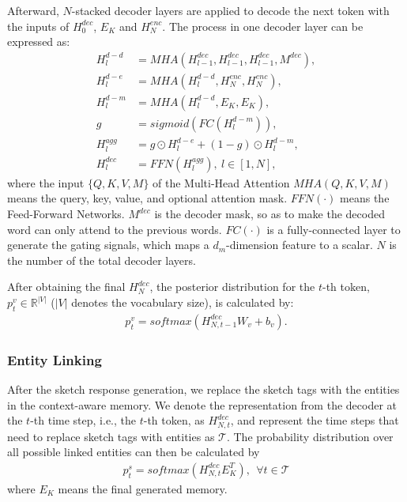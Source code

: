 \documentclass[11pt]{article}
\begin{document}
Afterward, $N$-stacked decoder layers are applied to decode the next token with the inputs of $H_0^{dec}$, $E_K$ and $H_N^{enc}$. The process in one decoder layer can be expressed as:
\begin{align}
    H_{l}^{d-d} &= MHA(H_{l-1}^{dec}, H_{l-1}^{dec}, H_{l-1}^{dec}, M^{dec}), \nonumber\\
    H_{l}^{d-e} &= MHA(H_{l}^{d-d}, H_N^{enc}, H_N^{enc}),  \nonumber\\
    H_{l}^{d-m} &= MHA(H_{l}^{d-d}, E_K, E_K),  \nonumber\\
    g &= sigmoid(FC(H_{l}^{d-m})),  \nonumber \\
    H_{l}^{agg} &= g \odot H_{l}^{d-e} + (1 - g) \odot H_{l}^{d-m},  \nonumber\\
    H_{l}^{dec} &= FFN(H_{l}^{agg}), \ l \in [1, N], \nonumber
\end{align}
where the input $\{Q,K,V,M\}$ of the Multi-Head Attention $MHA(Q, K, V, M)$ means the query, key, value, and optional attention mask. $FFN(\cdot)$ means the Feed-Forward Networks. $M^{dec}$ is the decoder mask, so as to make the decoded word can only attend to the previous words.
$FC(\cdot)$ is a fully-connected layer to generate the gating signals, which maps a $d_m$-dimension feature to a scalar. $N$ is the number of the total decoder layers.

After obtaining the final $H_{N}^{dec}$, the posterior distribution for the $t$-th token, $p_t^{v} \in \mathbb{R} ^{|V|}$ ($|V|$ denotes the vocabulary size), is calculated by:
\begin{gather}
    p_t^{v} = softmax(H_{N,t-1}^{dec}W_v + b_v). \nonumber
\end{gather}



\subsubsection{Entity Linking}
\label{ssec:linking}

After the sketch response generation, we replace the sketch tags with the entities in the context-aware memory. We denote the representation from the decoder at the $t$-th time step, i.e., the $t$-th token, as $H_{N,t}^{dec}$, and represent the time steps that need to replace sketch tags with entities as $\mathcal{T}$. The probability distribution over all possible linked entities can then be calculated by 
\begin{gather}
    p^s_t = softmax(H_{N,t}^{dec}E_K^T),~~\forall t \in \mathcal{T} \nonumber
\end{gather}
where $E_K$ means the final generated memory.
\end{document}
